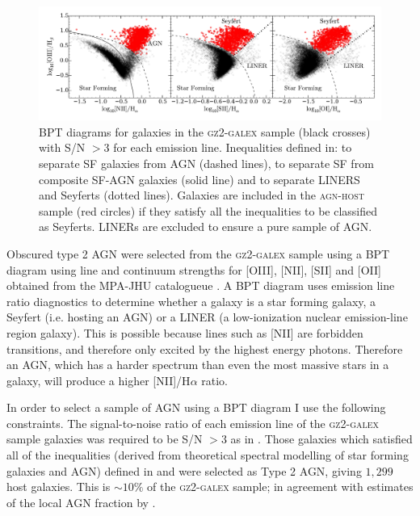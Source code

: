 \begin{figure}
\includegraphics[width=\textwidth]{agn/fig2.pdf}
\caption[BPT diagram used to select AGN host galaxies]{BPT diagrams for galaxies in the \textsc{gz2-galex} sample (black crosses) with S/N $> 3$ for each emission line. Inequalities defined in: \protect\cite{kewley01} to separate SF galaxies from AGN (dashed lines), \protect\cite{kauffmann03b} to separate SF from composite SF-AGN galaxies (solid line) and \protect\cite{kewley06} to separate LINERS and Seyferts (dotted lines).  Galaxies are included in the \textsc{agn-host} sample (red circles) if they satisfy all the inequalities to be classified as Seyferts. LINERs are excluded to ensure a pure sample of AGN.}
\label{bpt}
\end{figure}

Obscured type 2 AGN were selected from the \textsc{gz2-galex} sample using a BPT diagram \citep*{bpt} using line and continuum strengths for [OIII], [NII], [SII] and [OII] obtained from the MPA-JHU catalogueue \citep{kauffmann03, brinchmann04}. A BPT diagram uses emission line ratio diagnostics to determine whether a galaxy is a star forming galaxy, a Seyfert (i.e. hosting an AGN) or a LINER (a low-ionization nuclear emission-line region galaxy). This is possible because lines such as [NII] are forbidden transitions, and therefore only excited by the highest energy photons. Therefore an AGN, which has a harder spectrum than even the most massive stars in a galaxy, will produce a higher [NII]/H$\alpha$ ratio. 

In order to select a sample of AGN using a BPT diagram I use the following constraints. The signal-to-noise ratio of each emission line of the \textsc{gz2-galex} sample galaxies was required to be S/N $> 3$ as in \cite{schawinski10a}. Those galaxies which satisfied all of the inequalities (derived from theoretical spectral modelling of star forming galaxies and AGN) defined in \citet[][to separate SF galaxies from AGN]{kewley01} and \citet[][to separate SF galaxies from composite SF-AGN galaxies]{kauffmann03b} were selected as Type 2 AGN, giving $1,299$ host galaxies. This is $\sim10\%$ of the \textsc{gz2-galex} sample; in agreement with estimates of the local AGN fraction by \citealt{kauffmann04, pimbblet13}.

